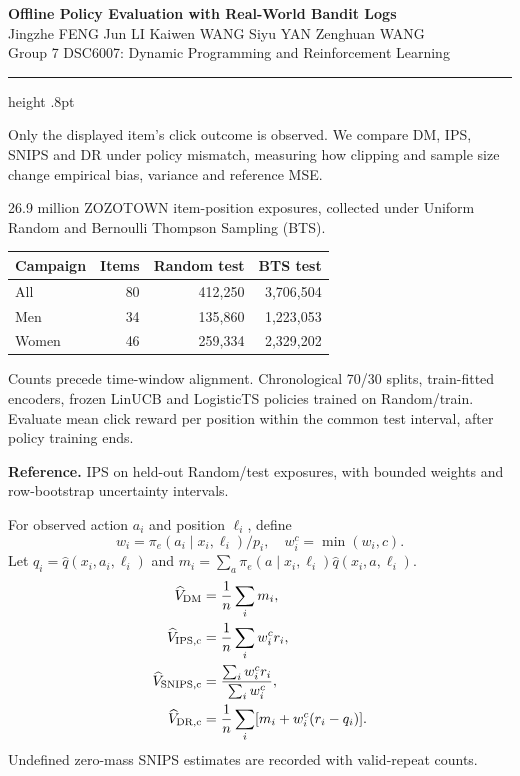 \documentclass[10pt]{article}
\begin{document}
\begin{center}
{\fontsize{20}{23}\selectfont\bfseries\color{navy}
Offline Policy Evaluation with Real-World Bandit Logs}\\[2mm]
{\fontsize{10}{12}\selectfont Jingzhe FENG \quad Jun LI \quad Kaiwen WANG \quad Siyu YAN \quad Zenghuan WANG}\\[1mm]
{\fontsize{9}{11}\selectfont Group 7 \quad DSC6007: Dynamic Programming and Reinforcement Learning}
\end{center}
\vspace{-1.5mm}
{\color{navy}\hrule height .8pt}
\vspace{1mm}
\begin{minipage}[t]{.322\textwidth}\vspace{0pt}
\begin{tcolorbox}[title={Background and objective}]
Only the displayed item's click outcome is observed. We compare DM, IPS,
SNIPS and DR under policy mismatch, measuring how clipping and sample size
change empirical bias, variance and reference MSE.
\end{tcolorbox}
\begin{tcolorbox}[title={Dataset and evaluation target}]
26.9 million ZOZOTOWN item-position exposures, collected under Uniform
Random and Bernoulli Thompson Sampling (BTS).

\begin{tabularx}{\linewidth}{@{}lrrr@{}}
\toprule
Campaign & Items & Random test & BTS test\\
\midrule
All & 80 & 412,250 & 3,706,504\\
Men & 34 & 135,860 & 1,223,053\\
Women & 46 & 259,334 & 2,329,202\\
\bottomrule
\end{tabularx}

Counts precede time-window alignment.
Chronological 70/30 splits, train-fitted encoders, frozen LinUCB and LogisticTS
policies trained on Random/train. Evaluate mean click reward per position
within the common test interval, after policy training ends.

\textbf{Reference.} IPS on held-out Random/test exposures, with bounded
weights and row-bootstrap uncertainty intervals.
\end{tcolorbox}
\begin{tcolorbox}[title={Estimators and clipping}]
For observed action $a_i$ and position $\ell_i$, define
\[
w_i=\pi_e(a_i\mid x_i,\ell_i)/p_i,\quad w_i^c=\min(w_i,c).
\]
Let $q_i=\widehat q(x_i,a_i,\ell_i)$ and
$m_i=\sum_a\pi_e(a\mid x_i,\ell_i)\widehat q(x_i,a,\ell_i)$.
\vspace{-3mm}
\begin{align*}
\widehat V_{\rm DM}&=\frac1n\sum_i m_i,\\
\widehat V_{\rm IPS,c}&=\frac1n\sum_i w_i^c r_i,\\
\widehat V_{\rm SNIPS,c}&=\frac{\sum_i w_i^c r_i}{\sum_i w_i^c},\\
\widehat V_{\rm DR,c}&=\frac1n\sum_i[m_i+w_i^c(r_i-q_i)].
\end{align*}
Undefined zero-mass SNIPS estimates are recorded with valid-repeat counts.
\end{tcolorbox}
\end{minipage}\hfill
\end{document}
